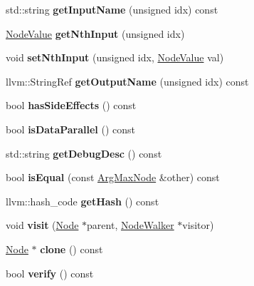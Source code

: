 \begin{DoxyCompactItemize}
\item 
\mbox{\label{classglow_1_1_arg_max_node_ab0799ea7e9ca47343a22edf62978e39f}} 
std\+::string {\bfseries get\+Input\+Name} (unsigned idx) const
\item 
\mbox{\label{classglow_1_1_arg_max_node_aadd3c9409166e44e121b655343e3d06f}} 
\hyperlink{structglow_1_1_node_value}{Node\+Value} {\bfseries get\+Nth\+Input} (unsigned idx)
\item 
\mbox{\label{classglow_1_1_arg_max_node_a45c008d27b91772cf3edcf691cdb624f}} 
void {\bfseries set\+Nth\+Input} (unsigned idx, \hyperlink{structglow_1_1_node_value}{Node\+Value} val)
\item 
\mbox{\label{classglow_1_1_arg_max_node_a56cfccf529ff1a5fc207c0294ab1094e}} 
llvm\+::\+String\+Ref {\bfseries get\+Output\+Name} (unsigned idx) const
\item 
\mbox{\label{classglow_1_1_arg_max_node_a24bbd7c9d0c4660b721c140509f78e06}} 
bool {\bfseries has\+Side\+Effects} () const
\item 
\mbox{\label{classglow_1_1_arg_max_node_a52c08368b6c60279fc9541dc17f62734}} 
bool {\bfseries is\+Data\+Parallel} () const
\item 
\mbox{\label{classglow_1_1_arg_max_node_a7def5a18f4097dc60be38544798b37fd}} 
std\+::string {\bfseries get\+Debug\+Desc} () const
\item 
\mbox{\label{classglow_1_1_arg_max_node_a68292fd3a3aa569da16082e7feca9f7d}} 
bool {\bfseries is\+Equal} (const \hyperlink{classglow_1_1_arg_max_node}{Arg\+Max\+Node} \&other) const
\item 
\mbox{\label{classglow_1_1_arg_max_node_a58e1f90e300306d87e82b0e70a5049a9}} 
llvm\+::hash\+\_\+code {\bfseries get\+Hash} () const
\item 
\mbox{\label{classglow_1_1_arg_max_node_a5fa67f8d010582e18907a90db4ba7a13}} 
void {\bfseries visit} (\hyperlink{classglow_1_1_node}{Node} $\ast$parent, \hyperlink{classglow_1_1_node_walker}{Node\+Walker} $\ast$visitor)
\item 
\mbox{\label{classglow_1_1_arg_max_node_a91c6e1459c3f5a7a7369254511bbb46a}} 
\hyperlink{classglow_1_1_node}{Node} $\ast$ {\bfseries clone} () const
\item 
\mbox{\label{classglow_1_1_arg_max_node_a7c2cf5953cfffdacb29ef8424394a620}} 
bool {\bfseries verify} () const
\end{DoxyCompactItemize}

